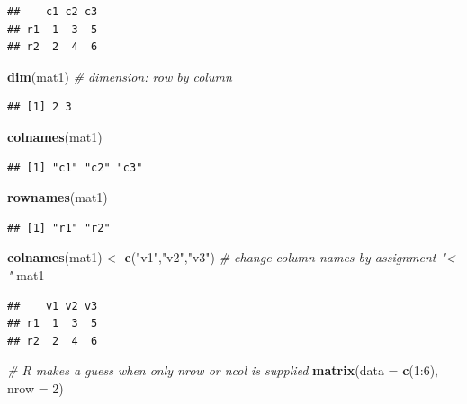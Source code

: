 \documentclass[]{book}
\newenvironment{Shaded}{\begin{snugshade}}{\end{snugshade}}
\newcommand{\KeywordTok}[1]{\textcolor[rgb]{0.13,0.29,0.53}{\textbf{{#1}}}}
\newcommand{\DataTypeTok}[1]{\textcolor[rgb]{0.13,0.29,0.53}{{#1}}}
\newcommand{\DecValTok}[1]{\textcolor[rgb]{0.00,0.00,0.81}{{#1}}}
\newcommand{\StringTok}[1]{\textcolor[rgb]{0.31,0.60,0.02}{{#1}}}
\newcommand{\CommentTok}[1]{\textcolor[rgb]{0.56,0.35,0.01}{\textit{{#1}}}}
\newcommand{\NormalTok}[1]{{#1}}
\theoremstyle{definition}
\theoremstyle{definition}
\theoremstyle{remark}
\begin{document}
\begin{verbatim}
##    c1 c2 c3
## r1  1  3  5
## r2  2  4  6
\end{verbatim}

\begin{Shaded}
\begin{Highlighting}[]
\KeywordTok{dim}\NormalTok{(mat1)  }\CommentTok{# dimension: row by column}
\end{Highlighting}
\end{Shaded}

\begin{verbatim}
## [1] 2 3
\end{verbatim}

\begin{Shaded}
\begin{Highlighting}[]
\KeywordTok{colnames}\NormalTok{(mat1)}
\end{Highlighting}
\end{Shaded}

\begin{verbatim}
## [1] "c1" "c2" "c3"
\end{verbatim}

\begin{Shaded}
\begin{Highlighting}[]
\KeywordTok{rownames}\NormalTok{(mat1)}
\end{Highlighting}
\end{Shaded}

\begin{verbatim}
## [1] "r1" "r2"
\end{verbatim}

\begin{Shaded}
\begin{Highlighting}[]
\KeywordTok{colnames}\NormalTok{(mat1) <-}\StringTok{ }\KeywordTok{c}\NormalTok{(}\StringTok{"v1"}\NormalTok{,}\StringTok{"v2"}\NormalTok{,}\StringTok{"v3"}\NormalTok{)  }\CommentTok{# change column names by assignment "<-" }
\NormalTok{mat1}
\end{Highlighting}
\end{Shaded}

\begin{verbatim}
##    v1 v2 v3
## r1  1  3  5
## r2  2  4  6
\end{verbatim}

\begin{Shaded}
\begin{Highlighting}[]
\CommentTok{# R makes a guess when only nrow or ncol is supplied}
\KeywordTok{matrix}\NormalTok{(}\DataTypeTok{data =} \KeywordTok{c}\NormalTok{(}\DecValTok{1}\NormalTok{:}\DecValTok{6}\NormalTok{), }\DataTypeTok{nrow =} \DecValTok{2}\NormalTok{)}
\end{Highlighting}
\end{Shaded}
\end{document}
